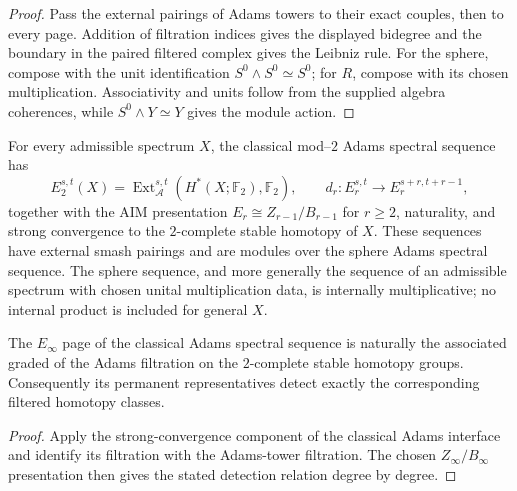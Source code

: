\begin{proof}
  Pass the external pairings of Adams towers to their exact couples, then to
  every page.  Addition of filtration indices gives the displayed bidegree and
  the boundary in the paired filtered complex gives the Leibniz rule.  For the
  sphere, compose with the unit identification
  $S^0\wedge S^0\simeq S^0$; for $R$, compose with its chosen multiplication.
  Associativity and units follow from the supplied algebra coherences, while
  $S^0\wedge Y\simeq Y$ gives the module action.
\end{proof}

\begin{definition}
  \label{def:classical-adams-ss}
  \notready
  For every admissible spectrum $X$, the classical mod--$2$ Adams spectral
  sequence has
  \[
    E_2^{s,t}(X)=\operatorname{Ext}_{\mathcal A}^{s,t}
      (H^*(X;\mathbb F_2),\mathbb F_2),
    \qquad d_r:E_r^{s,t}\to E_r^{s+r,t+r-1},
  \]
  together with the AIM presentation
  $E_r\cong Z_{r-1}/B_{r-1}$ for $r\ge2$, naturality, and strong
  convergence to the $2$-complete stable homotopy of $X$.  These sequences
  have external smash pairings and are modules over the sphere Adams spectral
  sequence.  The sphere sequence, and more generally the sequence of an
  admissible spectrum with chosen unital multiplication data, is internally
  multiplicative; no internal product is included for general $X$.
\end{definition}

\begin{proposition}
  \label{prop:classical-adams-convergence}
  \notready
  The $E_\infty$ page of the classical Adams spectral sequence is naturally
  the associated graded of the Adams filtration on the $2$-complete stable
  homotopy groups.  Consequently its permanent representatives detect exactly
  the corresponding filtered homotopy classes.
\end{proposition}

\begin{proof}
  Apply the strong-convergence component of the classical Adams interface and
  identify its filtration with the Adams-tower filtration.  The chosen
  $Z_\infty/B_\infty$ presentation then gives the stated detection relation
  degree by degree.
\end{proof}

